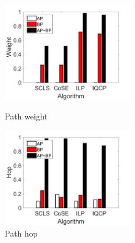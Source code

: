 \begin{figure}[htbp]
\centering
\begin{minipage}[t]{0.45\linewidth}
\centering
\includegraphics[width=2.25in]{figures/weight}
\caption{Path weight}
\label{fig:normalization weitgh sum}
\end{minipage}
\hfill
\begin{minipage}[t]{0.45\linewidth}
\centering
\includegraphics[width=2.25in]{figures/hop}
\caption{Path hop}
\label{fig:normalization hop}
\end{minipage}
\end{figure}


